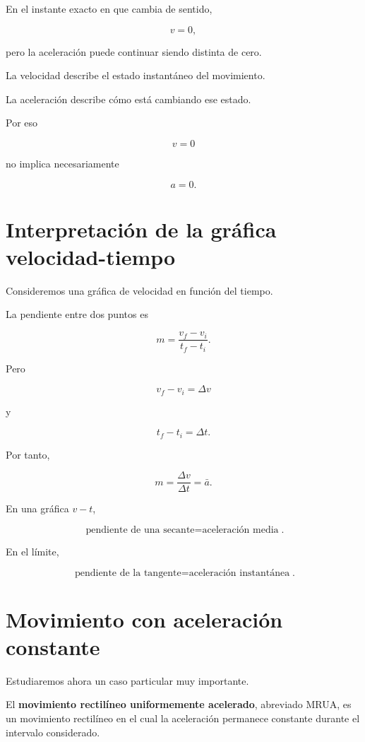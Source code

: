 En el instante exacto en que cambia de sentido,

\[ v=0, \]

pero la aceleración puede continuar siendo distinta de cero.

\begin{idea}
La velocidad describe el estado instantáneo del movimiento.

La aceleración describe cómo está cambiando ese estado.

Por eso

\[ v=0 \]

no implica necesariamente

\[ a=0. \]
\end{idea}


\section{Interpretación de la gráfica velocidad-tiempo}

Consideremos una gráfica de velocidad en función del tiempo.

La pendiente entre dos puntos es

\[
m
=
\frac{v_f-v_i}{t_f-t_i}.
\]

Pero

\[
v_f-v_i=\Delta v
\]

y

\[
t_f-t_i=\Delta t.
\]

Por tanto,

\[ \boxed{m=\frac{\Delta v}{\Delta t}=\bar{a}}. \]

\begin{idea}
En una gráfica \(v-t\),

\[
\boxed{
\text{pendiente de una secante}
=
\text{aceleración media}
}.
\]

En el límite,

\[
\boxed{
\text{pendiente de la tangente}
=
\text{aceleración instantánea}
}.
\]
\end{idea}


\section{Movimiento con aceleración constante}

Estudiaremos ahora un caso particular muy importante.

\begin{definicion}
El \textbf{movimiento rectilíneo uniformemente acelerado}, abreviado MRUA,
es un movimiento rectilíneo en el cual la aceleración permanece constante
durante el intervalo considerado.
\end{definicion}

